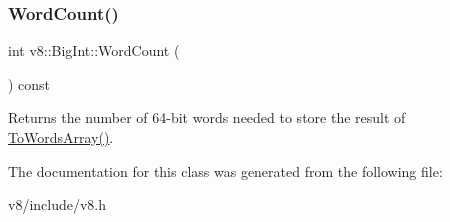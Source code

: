 \subsubsection{\texorpdfstring{Word\+Count()}{WordCount()}}
{\footnotesize\ttfamily int v8\+::\+Big\+Int\+::\+Word\+Count (\begin{DoxyParamCaption}{ }\end{DoxyParamCaption}) const}

Returns the number of 64-\/bit words needed to store the result of \mbox{\hyperlink{classv8_1_1BigInt_adbc582fd6ae26b6afe9b5591b5fe06e7}{To\+Words\+Array()}}. 

The documentation for this class was generated from the following file\+:\begin{DoxyCompactItemize}
\item 
v8/include/v8.\+h\end{DoxyCompactItemize}

